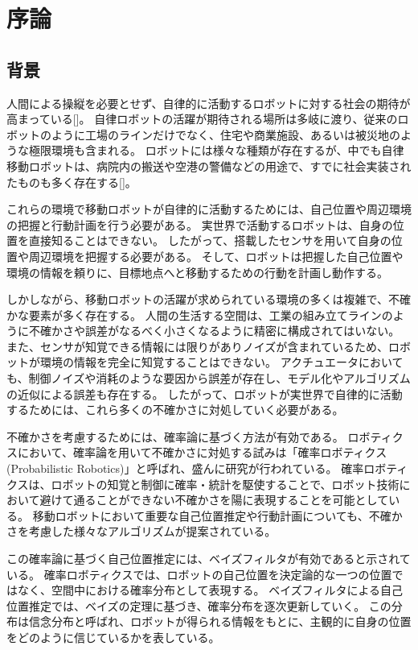 \chapter{序論} \label{chapter:introduction}


\section{背景} \label{section:backglound}

人間による操縦を必要とせず、自律的に活動するロボットに対する社会の期待が高まっている[]。
自律ロボットの活躍が期待される場所は多岐に渡り、従来のロボットのように工場のラインだけでなく、住宅や商業施設、あるいは被災地のような極限環境も含まれる。
ロボットには様々な種類が存在するが、中でも自律移動ロボットは、病院内の搬送や空港の警備などの用途で、すでに社会実装されたものも多く存在する[]。

これらの環境で移動ロボットが自律的に活動するためには、自己位置や周辺環境の把握と行動計画を行う必要がある。
実世界で活動するロボットは、自身の位置を直接知ることはできない。 %
したがって、搭載したセンサを用いて自身の位置や周辺環境を把握する必要がある。
そして、ロボットは把握した自己位置や環境の情報を頼りに、目標地点へと移動するための行動を計画し動作する。

しかしながら、移動ロボットの活躍が求められている環境の多くは複雑で、不確かな要素が多く存在する。
人間の生活する空間は、工業の組み立てラインのように不確かさや誤差がなるべく小さくなるように精密に構成されてはいない。
また、センサが知覚できる情報には限りがありノイズが含まれているため、ロボットが環境の情報を完全に知覚することはできない。
アクチュエータにおいても、制御ノイズや消耗のような要因から誤差が存在し、モデル化やアルゴリズムの近似による誤差も存在する。
したがって、ロボットが実世界で自律的に活動するためには、これら多くの不確かさに対処していく必要がある。

不確かさを考慮するためには、確率論に基づく方法が有効である。
ロボティクスにおいて、確率論を用いて不確かさに対処する試みは「確率ロボティクス(Probabilistic Robotics)」と呼ばれ、盛んに研究が行われている\cite{thrun2005,上田2007prob}。
確率ロボティクスは、ロボットの知覚と制御に確率・統計を駆使することで、ロボット技術において避けて通ることができない不確かさを陽に表現することを可能としている。
移動ロボットにおいて重要な自己位置推定や行動計画についても、不確かさを考慮した様々なアルゴリズムが提案されている。

この確率論に基づく自己位置推定には、ベイズフィルタが有効であると示されている。
確率ロボティクスでは、ロボットの自己位置を決定論的な一つの位置ではなく、空間中における確率分布として表現する。
ベイズフィルタによる自己位置推定では、ベイズの定理に基づき、確率分布を逐次更新していく。
この分布は信念分布と呼ばれ、ロボットが得られる情報をもとに、主観的に自身の位置をどのように信じているかを表している。


